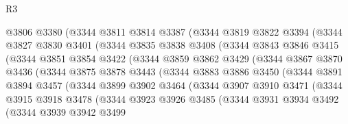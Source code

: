 \begin{lexlean}{R3}
\begin{coremodule}
              @3806
              @3380
              (@3344
                @3811
                @3814
                @3387
                (@3344
                  @3819
                  @3822
                  @3394
                  (@3344
                    @3827
                    @3830
                    @3401
                    (@3344
                      @3835
                      @3838
                      @3408
                      (@3344
                        @3843
                        @3846
                        @3415
                        (@3344
                          @3851
                          @3854
                          @3422
                          (@3344
                            @3859
                            @3862
                            @3429
                            (@3344
                              @3867
                              @3870
                              @3436
                              (@3344
                                @3875
                                @3878
                                @3443
                                (@3344
                                  @3883
                                  @3886
                                  @3450
                                  (@3344
                                    @3891
                                    @3894
                                    @3457
                                    (@3344
                                      @3899
                                      @3902
                                      @3464
                                      (@3344
                                        @3907
                                        @3910
                                        @3471
                                        (@3344
                                          @3915
                                          @3918
                                          @3478
                                          (@3344
                                            @3923
                                            @3926
                                            @3485
                                            (@3344
                                              @3931
                                              @3934
                                              @3492
                                              (@3344
                                                @3939
                                                @3942
                                                @3499

\end{coremodule}
\end{lexlean}
